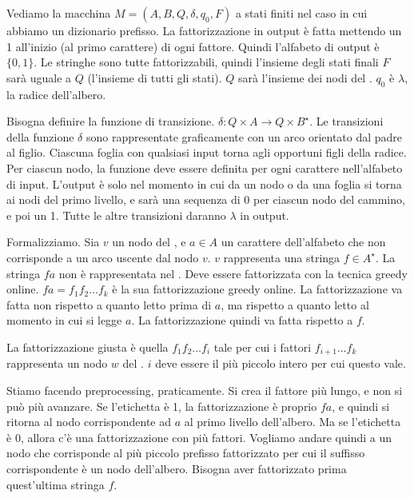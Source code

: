 Vediamo la macchina $M = (A, B, Q, \delta, q_0, F)$ a stati finiti nel caso in cui abbiamo un dizionario prefisso. La fattorizzazione in output \`e fatta mettendo un 1 all'inizio (al primo carattere) di ogni fattore. Quindi l'alfabeto di output \`e $\{ 0, 1\}$. Le stringhe sono tutte fattorizzabili, quindi l'insieme degli stati finali $F$ sar\`a uguale a $Q$ (l'insieme di tutti gli stati). $Q$ sar\`a l'insieme dei nodi del . $q_0$ \`e $\lambda$, la radice dell'albero.


Bisogna definire la funzione di transizione. $\delta : Q \times A \to Q \times B^{\star}$. Le transizioni della funzione $\delta$ sono rappresentate graficamente con un arco orientato dal padre al figlio. Ciascuna foglia con qualsiasi input torna agli opportuni figli della radice. Per ciascun nodo, la funzione deve essere definita per ogni carattere nell'alfabeto di input. L'output \`e solo nel momento in cui da un nodo o da una foglia si torna ai nodi del primo livello, e sar\`a una sequenza di 0 per ciascun nodo del cammino, e poi un 1. Tutte le altre transizioni daranno $\lambda$ in output.

Formalizziamo. Sia $v$ un nodo del , e $a \in A$ un carattere dell'alfabeto che non corrisponde a un arco uscente dal nodo $v$. $v$ rappresenta una stringa $f \in A^{\star}$. La stringa $fa$ non \`e rappresentata nel . Deve essere fattorizzata con la tecnica greedy online. $fa = f_1 f_2 \ldots f_k$ \`e la sua fattorizzazione greedy online. La fattorizzazione va fatta non rispetto a quanto letto prima di $a$, ma rispetto a quanto letto al momento in cui si legge $a$. La fattorizzazione quindi va fatta rispetto a $f$.

La fattorizzazione giusta \`e quella $f_1 f_2 \ldots f_i$ tale per cui i fattori $f_{i+1} \ldots f_k$ rappresenta un nodo $w$ del . $i$ deve essere il pi\`u piccolo intero per cui questo vale.

Stiamo facendo preprocessing, praticamente. Si crea il fattore pi\`u lungo, e non si pu\`o pi\`u avanzare. Se l'etichetta \`e 1, la fattorizzazione \`e proprio $f a$, e quindi si ritorna al nodo corrispondente ad $a$ al primo livello dell'albero. Ma se l'etichetta \`e 0, allora c'\`e una fattorizzazione con pi\`u fattori. Vogliamo andare quindi a un nodo che corrisponde al pi\`u piccolo prefisso fattorizzato per cui il suffisso corrispondente \`e un nodo dell'albero. Bisogna aver fattorizzato prima quest'ultima stringa $f$.

